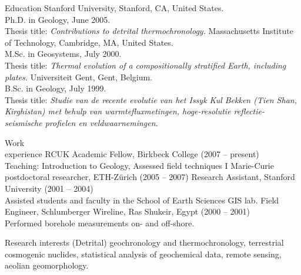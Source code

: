 \documentclass{resume}
\author{Pieter Vermeesch}
\begin{document}
\maketitle


\begin{category}{Education}
\citembullet Stanford University, Stanford, CA, United States.\\
Ph.D. in Geology, June 2005.\\
Thesis title: {\em Contributions to detrital thermochronology.}
\citembullet Massachusetts Institute of Technology, Cambridge, MA, United States. \\
M.Sc. in Geosystems, July 2000.\\
Thesis title: {\em Thermal evolution of a compositionally stratified
Earth,  including plates.}
\citembullet Universiteit Gent, Gent, Belgium.\\
B.Sc. in Geology, July 1999.\\
Thesis title: {\em Studie van  de recente evolutie van het Issyk Kul
Bekken  (Tien  Shan, Kirghistan)  met  behulp van  warmtefluxmetingen,
hoge-resolutie         reflectie-seismische        profielen        en
veldwaarnemingen.}
\end{category}


\begin{category}{Work \\experience}
\citembullet RCUK Academic Fellow, Birkbeck College (2007 -- present)\\
Teaching: Introduction to Geology, Assessed field techniques I
\citembullet Marie-Curie postdoctoral researcher, ETH-Z\"{u}rich (2005 -- 2007)
\citembullet Research Assistant, Stanford University (2001 -- 2004)\\
Assisted students and faculty in the School of Earth Sciences GIS lab.
\citembullet Field Engineer, Schlumberger Wireline, Ras Shukeir, Egypt (2000 -- 2001)\\
Performed borehole measurements on- and off-shore.
\end{category}


\begin{category}{Research interests}
\citemnobullet (Detrital) geochronology and thermochronology, terrestrial cosmogenic nuclides, 
statistical analysis of geochemical data, remote sensing, aeolian geomorphology.
\end{category}
\end{document}
